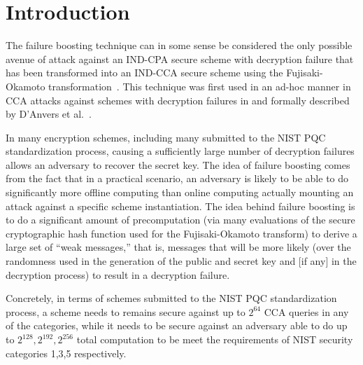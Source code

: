 \section{Introduction}
\label{sec:intro}

The failure boosting technique can in some sense be
considered the only possible avenue of attack against an
IND-CPA secure scheme with decryption failure that has been
transformed into an IND-CCA secure scheme using the Fujisaki-Okamoto transformation~\cite{DBLP:conf/tcc/HofheinzHK17,DBLP:conf/crypto/JiangZCWM18}. This
technique was first used in an ad-hoc manner in CCA attacks
against schemes with decryption failures in  and
formally described by D'Anvers et
al.~\cite{DBLP:conf/pkc/DAnversGJNVV19}. 

In many encryption schemes,
including many submitted to the NIST PQC standardization process,
causing a sufficiently large number of
decryption failures allows an adversary to recover the secret
key. The idea of failure boosting comes from the fact
that in a practical scenario, an adversary is likely to be able to
do significantly more offline computing than online
computing actually mounting an attack against a specific scheme
instantiation. The idea behind failure boosting is to do a significant
amount of precomputation (via many evaluations of the secure cryptographic
hash function used for the Fujisaki-Okamoto transform) to derive a
large set of ``weak messages,'' that is, messages that will be more
likely (over the randomness used in the generation of the public and
secret key and [if any] in the decryption process) to result in a
decryption failure. 

Concretely, in terms of schemes submitted to the NIST PQC
standardization process, a scheme needs to remains secure against up
to $2^{64}$ CCA queries in any of the categories, while it needs to
 be secure against an adversary able to do up to $2^{128},2^{192},2^{256}$
total computation to be meet the requirements of NIST security categories 1,3,5
respectively. 


